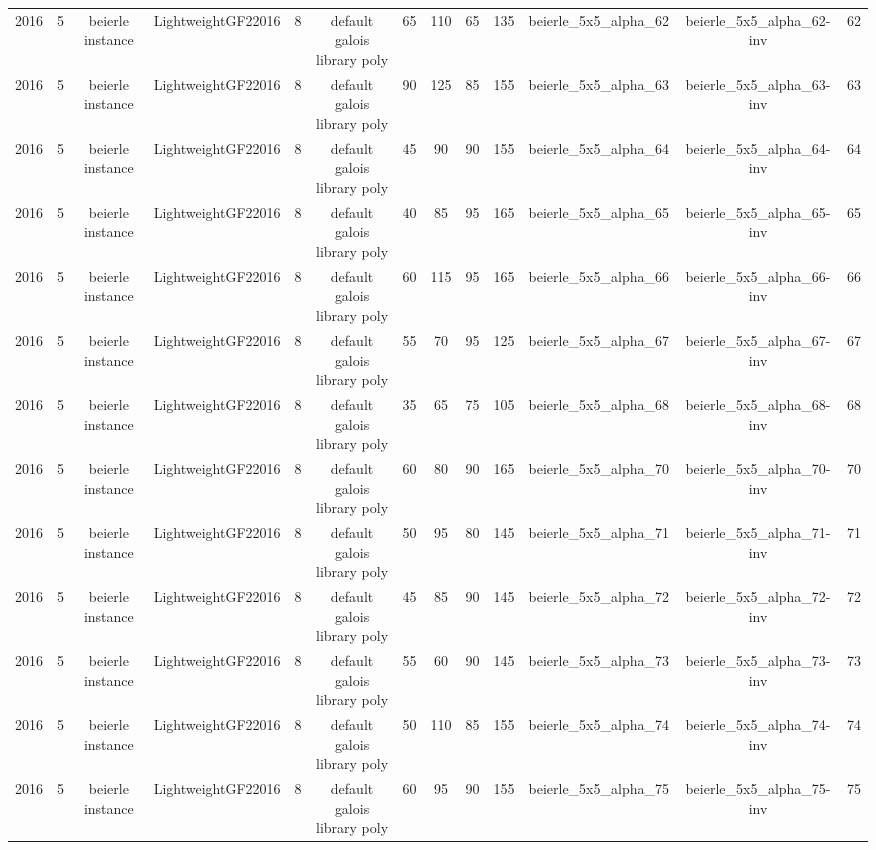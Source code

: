 \begin{tabular}{c c c c c c c c c c c c c}
2016 & 5 & beierle instance & LightweightGF22016 & 8 & default galois library poly & 65 & 110 & 65 & 135 & beierle_5x5_alpha_62 & beierle_5x5_alpha_62-inv & 62 \\
2016 & 5 & beierle instance & LightweightGF22016 & 8 & default galois library poly & 90 & 125 & 85 & 155 & beierle_5x5_alpha_63 & beierle_5x5_alpha_63-inv & 63 \\
2016 & 5 & beierle instance & LightweightGF22016 & 8 & default galois library poly & 45 & 90 & 90 & 155 & beierle_5x5_alpha_64 & beierle_5x5_alpha_64-inv & 64 \\
2016 & 5 & beierle instance & LightweightGF22016 & 8 & default galois library poly & 40 & 85 & 95 & 165 & beierle_5x5_alpha_65 & beierle_5x5_alpha_65-inv & 65 \\
2016 & 5 & beierle instance & LightweightGF22016 & 8 & default galois library poly & 60 & 115 & 95 & 165 & beierle_5x5_alpha_66 & beierle_5x5_alpha_66-inv & 66 \\
2016 & 5 & beierle instance & LightweightGF22016 & 8 & default galois library poly & 55 & 70 & 95 & 125 & beierle_5x5_alpha_67 & beierle_5x5_alpha_67-inv & 67 \\
2016 & 5 & beierle instance & LightweightGF22016 & 8 & default galois library poly & 35 & 65 & 75 & 105 & beierle_5x5_alpha_68 & beierle_5x5_alpha_68-inv & 68 \\
2016 & 5 & beierle instance & LightweightGF22016 & 8 & default galois library poly & 60 & 80 & 90 & 165 & beierle_5x5_alpha_70 & beierle_5x5_alpha_70-inv & 70 \\
2016 & 5 & beierle instance & LightweightGF22016 & 8 & default galois library poly & 50 & 95 & 80 & 145 & beierle_5x5_alpha_71 & beierle_5x5_alpha_71-inv & 71 \\
2016 & 5 & beierle instance & LightweightGF22016 & 8 & default galois library poly & 45 & 85 & 90 & 145 & beierle_5x5_alpha_72 & beierle_5x5_alpha_72-inv & 72 \\
2016 & 5 & beierle instance & LightweightGF22016 & 8 & default galois library poly & 55 & 60 & 90 & 145 & beierle_5x5_alpha_73 & beierle_5x5_alpha_73-inv & 73 \\
2016 & 5 & beierle instance & LightweightGF22016 & 8 & default galois library poly & 50 & 110 & 85 & 155 & beierle_5x5_alpha_74 & beierle_5x5_alpha_74-inv & 74 \\
2016 & 5 & beierle instance & LightweightGF22016 & 8 & default galois library poly & 60 & 95 & 90 & 155 & beierle_5x5_alpha_75 & beierle_5x5_alpha_75-inv & 75 \\

\end{tabular}
